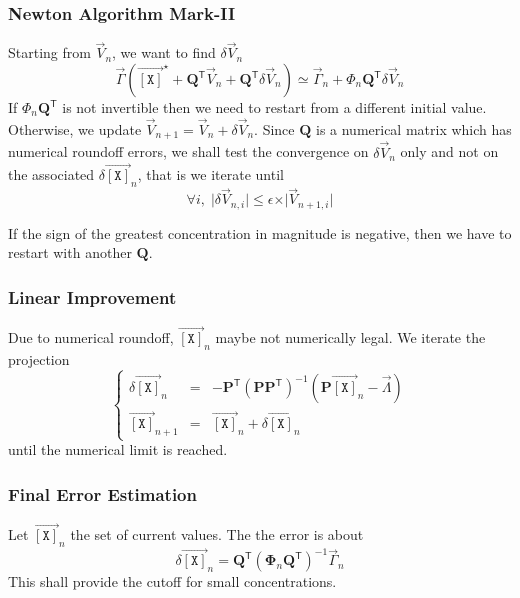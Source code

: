 \documentclass[aps,twocolumn]{revtex4}
\newcommand{\myconc}[1]{\left\lbrack #1 \right\rbrack}
\newcommand{\mychem}[1]{{\mathtt{#1}}}
\newcommand{\mymat}[1]{\boldsymbol{#1}}
\newcommand{\mytrn}[1]{{#1}^{\mathsf{T}}}
\newcommand{\myvec}[1]{\overrightarrow{#1}}
\newcommand{\vecX}{\myvec{\myconc{\mychem{X}}}}
\begin{document}
\subsubsection{Newton Algorithm Mark-II}
Starting from $\vec{V}_{n}$, we want to find $\delta\vec{V}_n$
\begin{equation}
	\vec{\Gamma}\left(\vecX^\star +  \mytrn{\mymat{Q}}\vec{V}_n + \mytrn{\mymat{Q}}\delta\vec{V}_n\right)
	\simeq \vec{\Gamma}_{n} + \Phi_n  \mytrn{\mymat{Q}} \delta\vec{V}_n
\end{equation}
If $\Phi_n  \mytrn{\mymat{Q}}$ is not invertible then we need to restart from a different initial value.\\
Otherwise, we update $\vec{V}_{n+1}= \vec{V}_{n} + \delta\vec{V}_{n}$.
Since $\mymat{Q}$ is a numerical matrix which has numerical roundoff errors, we shall test the convergence
 on $\delta\vec{V}_{n}$ only and not on the associated $\delta \vecX_n$, that is
we iterate until
\begin{equation}
	\forall i, \; \vert\delta\vec{V}_{n,i}\vert \leq \epsilon \times \vert \vec{V}_{n+1,i}\vert
\end{equation}

If the sign of the greatest concentration in magnitude is negative, then we have to restart with another $\mymat{Q}$.


\subsubsection{Linear Improvement}
Due to numerical roundoff, $\vecX_n$ maybe not numerically legal.
We iterate the projection
\begin{equation}
	\left\lbrace
	\begin{array}{rcl}
	\delta \vecX_n & = & - \mytrn{\mymat{P}} \left(\mymat{P} \mytrn{\mymat{P}}\right)^{-1} \left( \mymat{P}\vecX_n - \vec{\Lambda} \right)\\
	\vecX_{n+1}    & = & \vecX_n + \delta\vecX_n
	\end{array}
	\right.
\end{equation}
until the numerical limit is reached.

\subsubsection{Final Error Estimation}
Let $\vecX_n$ the set of current values. The the error is about
\begin{equation}
	\delta \vecX_n = \mytrn{\mymat{Q}}\left(\mymat{\Phi}_n\mytrn{\mymat{Q}}\right)^{-1} \vec{\Gamma}_n
\end{equation}
This shall provide the cutoff for small concentrations.
\end{document}
